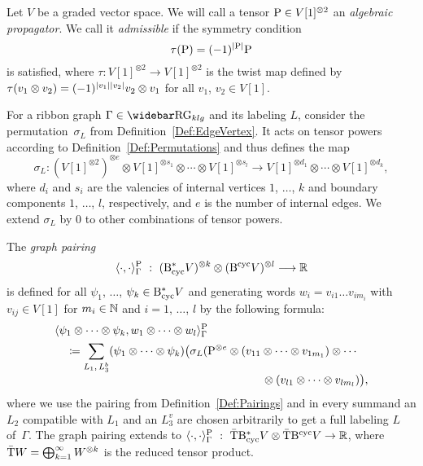\documentclass[\MainFolder/Text.tex]{subfiles}
\begin{document}
\begin{Def}\label{Def:EvalRibGraph}
Let $V$ be a graded vector space. We will call a tensor $\mathrm{P}\in V[1]^{\otimes 2}$ an \emph{algebraic propagator}. We call it \emph{admissible} if the symmetry condition
\begin{equation}\label{Eq:SymmetryCondition}
 \tau(\mathrm{P}) = (-1)^{|\mathrm{P}|} \mathrm{P}
\end{equation}
is satisfied, where $\tau: V[1]^{\otimes 2} \rightarrow V[1]^{\otimes 2}$ is the twist map defined by $\tau(v_1 \otimes v_2) = (-1)^{|v_1||v_2|} v_2 \otimes v_1$ for all $v_1$, $v_2\in V[1]$.

For a ribbon graph $\Gamma \in \RRG_{klg}$ and its labeling $L$, consider the permutation~$\sigma_L$ from Definition~\ref{Def:EdgeVertex}. It acts on tensor powers according to Definition~\ref{Def:Permutations} and thus defines the map
\begin{equation*} \sigma_L: (V[1]^{\otimes 2})^{\otimes e} \otimes V[1]^{\otimes s_1} \otimes \dotsb \otimes V[1]^{\otimes s_l} \longrightarrow V[1]^{\otimes d_1} \otimes \dotsb \otimes V[1]^{\otimes d_k},
\end{equation*}
where $d_i$ and $s_i$ are the valencies of internal vertices $1$, $\dotsc$, $k$ and boundary components $1$, $\dotsc$, $l$, respectively, and $e$ is the number of internal edges. We extend $\sigma_L$ by $0$ to other combinations of tensor powers.

The \emph{graph pairing}
\[ \langle \cdot, \cdot \rangle_{\Gamma}^{\mathrm{P}}\ :\ (\mathrm{B}_{\mathrm{cyc}}^* V)^{\otimes k} \otimes (\mathrm{B}^{\mathrm{cyc}} V)^{\otimes l} \longrightarrow \mathbb{R}  \]
is defined for all $\psi_1$, $\dotsc$, $\psi_{k} \in \mathrm{B}_{\mathrm{cyc}}^* V$ and generating words $w_i = v_{i1} \dots v_{i m_i}$ with $v_{ij} \in V[1]$ for $m_{i} \in \mathbb{N}$ and $i=1$, $\dotsc$, $l$ by the following formula:
\begin{align*}
&\langle \psi_1\otimes \dotsb \otimes \psi_{k}, w_1 \otimes \dotsb \otimes w_l \rangle_{\Gamma}^{\Prpg} \\
 &\quad \coloneqq \begin{multlined}[t]\smash{\sum_{L_1,\,L_3^b}}\vphantom{\sum_{L}} (\psi_1 \otimes \dotsb \otimes \psi_k)\bigl(\sigma_L(\Prpg^{\otimes e}\otimes  (v_{11}\otimes \dotsb \otimes v_{1 m_1}) \otimes \dotsb \\ \otimes (v_{l1}\otimes \dotsb \otimes v_{l m_{l}})\bigr), \end{multlined}
\end{align*}
where we use the pairing from Definition~\ref{Def:Pairings} and in every summand an $L_2$ compatible with $L_1$ and an $L_{3}^v$ are chosen arbitrarily to get a full labeling $L$ of~$\Gamma$. The graph pairing extends to $\langle \cdot, \cdot\rangle_\Gamma^{\mathrm{P}}\ :\ \bar{\mathrm{T}} \mathrm{B}_{\mathrm{cyc}}^* V \otimes \bar{\mathrm{T}} \mathrm{B}^{\mathrm{cyc}} V \rightarrow \mathbb{R}$, where $\bar{\mathrm{T}} W = \bigoplus_{k=1}^\infty W^{\otimes k}$ is the reduced tensor product.
\end{Def}
\end{document}
